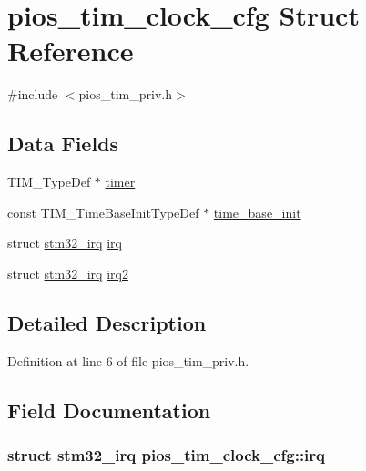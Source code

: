 \hypertarget{structpios__tim__clock__cfg}{\section{pios\-\_\-tim\-\_\-clock\-\_\-cfg \-Struct \-Reference}
\label{structpios__tim__clock__cfg}
}


{\ttfamily \#include $<$pios\-\_\-tim\-\_\-priv.\-h$>$}

\subsection*{\-Data \-Fields}
\begin{DoxyCompactItemize}
\item 
\-T\-I\-M\-\_\-\-Type\-Def $\ast$ \hyperlink{structpios__tim__clock__cfg_a537f6f4946bc2f5e188a9c3fec55647e}{timer}
\item 
const \-T\-I\-M\-\_\-\-Time\-Base\-Init\-Type\-Def $\ast$ \hyperlink{structpios__tim__clock__cfg_abdc708ba1a22f20e3f31502ca32b2c13}{time\-\_\-base\-\_\-init}
\item 
struct \hyperlink{structstm32__irq}{stm32\-\_\-irq} \hyperlink{structpios__tim__clock__cfg_a18666698f574b98c40132fe328ba981c}{irq}
\item 
struct \hyperlink{structstm32__irq}{stm32\-\_\-irq} \hyperlink{structpios__tim__clock__cfg_acb3841e388653b5ab1b67bfcc2418b33}{irq2}
\end{DoxyCompactItemize}


\subsection{\-Detailed \-Description}


\-Definition at line 6 of file pios\-\_\-tim\-\_\-priv.\-h.



\subsection{\-Field \-Documentation}
\hypertarget{structpios__tim__clock__cfg_a18666698f574b98c40132fe328ba981c}{
\subsubsection[{irq}]{\setlength{\rightskip}{0pt plus 5cm}struct {\bf stm32\-\_\-irq} {\bf pios\-\_\-tim\-\_\-clock\-\_\-cfg\-::irq}}}\label{structpios__tim__clock__cfg_a18666698f574b98c40132fe328ba981c}


